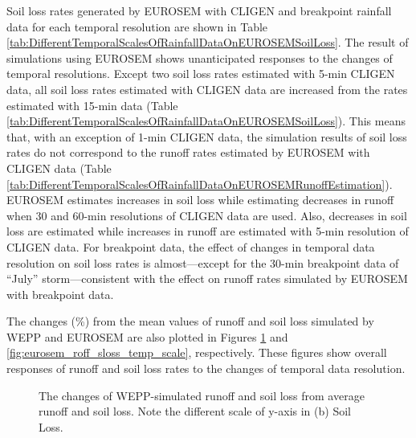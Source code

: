 Soil loss rates generated by EUROSEM with CLIGEN and breakpoint rainfall data
for each temporal resolution are shown in Table
\ref{tab:DifferentTemporalScalesOfRainfallDataOnEUROSEMSoilLoss}. The result of
simulations using EUROSEM shows unanticipated responses to the changes of
temporal resolutions. Except two soil loss rates estimated with 5-min CLIGEN
data, all soil loss rates estimated with CLIGEN data are increased from the
rates estimated with 15-min data
(Table \ref{tab:DifferentTemporalScalesOfRainfallDataOnEUROSEMSoilLoss}). This
means that, with an exception of 1-min CLIGEN data, the simulation results of
soil loss rates do not correspond to the runoff rates estimated by EUROSEM with
CLIGEN data (Table
\ref{tab:DifferentTemporalScalesOfRainfallDataOnEUROSEMRunoffEstimation}).
EUROSEM estimates increases in soil loss while estimating decreases in runoff
when 30 and 60-min resolutions of CLIGEN data are used. Also, decreases in soil
loss are estimated while increases in runoff are estimated with 5-min resolution
of CLIGEN data. For breakpoint data, the effect of changes in temporal data
resolution on soil loss rates is almost---except for the 30-min breakpoint data
of ``July'' storm---consistent with the effect on runoff rates simulated by
EUROSEM with breakpoint data.

The changes (\%) from the mean values of runoff and soil loss simulated by WEPP
and EUROSEM are also plotted in Figures \ref{fig:wepp_roff_sloss_temp_scale} and
\ref{fig:eurosem_roff_sloss_temp_scale}, respectively. These figures show
overall responses of runoff and soil loss rates to the changes of temporal data
resolution.

\begin{figure}[p]
  \centering
  \caption[WEPP runoff and soil loss changes]{The changes of WEPP-simulated
runoff and soil loss from average runoff and soil loss. Note the different scale
of y-axis in (b) Soil Loss.}
  \label{fig:wepp_roff_sloss_temp_scale}
\end{figure}

